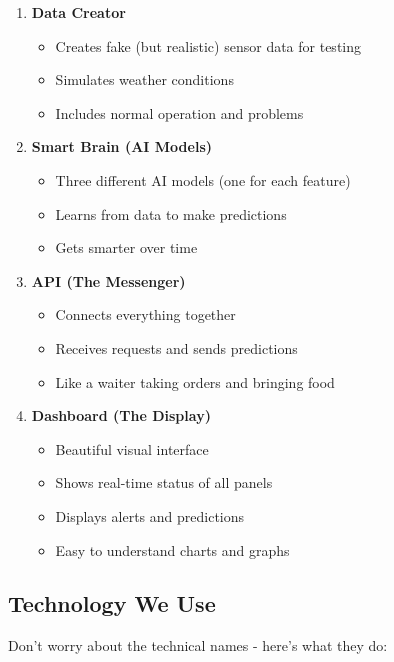 \documentclass[12pt,a4paper]{article}
\begin{document}
\begin{enumerate}[leftmargin=*]
    \item \textbf{Data Creator}
    \begin{itemize}
        \item Creates fake (but realistic) sensor data for testing
        \item Simulates weather conditions
        \item Includes normal operation and problems
    \end{itemize}
    
    \item \textbf{Smart Brain (AI Models)}
    \begin{itemize}
        \item Three different AI models (one for each feature)
        \item Learns from data to make predictions
        \item Gets smarter over time
    \end{itemize}
    
    \item \textbf{API (The Messenger)}
    \begin{itemize}
        \item Connects everything together
        \item Receives requests and sends predictions
        \item Like a waiter taking orders and bringing food
    \end{itemize}
    
    \item \textbf{Dashboard (The Display)}
    \begin{itemize}
        \item Beautiful visual interface
        \item Shows real-time status of all panels
        \item Displays alerts and predictions
        \item Easy to understand charts and graphs
    \end{itemize}
\end{enumerate}

\subsection{Technology We Use}

Don't worry about the technical names - here's what they do:
\end{document}
